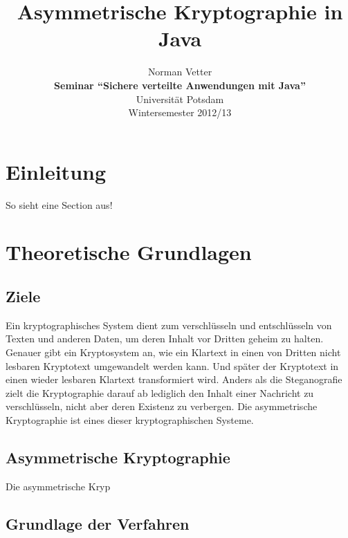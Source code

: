 \documentclass[paper=a4,11pt,german]{scrartcl} %
\begin{document}
%
\title{Asymmetrische Kryptographie in Java}

\author{Norman Vetter\\
\textbf{Seminar "`Sichere verteilte Anwendungen mit Java"'}\\
Universität Potsdam\\
Wintersemester 2012/13}

\date{}

\maketitle

%
\tableofcontents

\section{Einleitung}
So sieht eine Section aus!

\section{Theoretische Grundlagen}

\subsection{Ziele}
Ein kryptographisches System dient zum verschlüsseln und entschlüsseln von Texten und anderen Daten, um deren Inhalt vor Dritten geheim zu halten. Genauer gibt ein Kryptosystem an, wie ein Klartext in einen von Dritten nicht lesbaren Kryptotext umgewandelt werden kann. Und später der Kryptotext in einen wieder lesbaren Klartext transformiert wird. Anders als die Steganografie zielt die Kryptographie darauf ab lediglich den Inhalt einer Nachricht zu verschlüsseln, nicht aber deren Existenz zu verbergen. Die asymmetrische Kryptographie ist eines dieser kryptographischen Systeme.

\subsection{Asymmetrische Kryptographie}
Die asymmetrische Kryp
\subsection{Grundlage der Verfahren}
\end{document}
